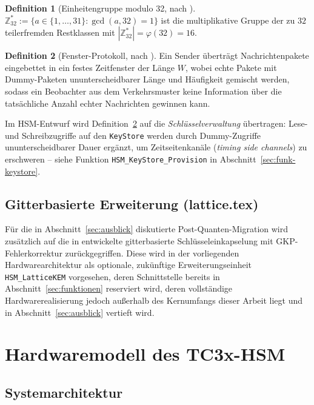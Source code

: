 ﻿\documentclass[a4paper,12pt]{article}
\theoremstyle{definition}
\newtheorem{definition}{Definition}
\begin{document}
\begin{definition}[Einheitengruppe modulo 32, nach \cite{Epp26c}]
	\label{def:z32}
	$\mathbb{Z}_{32}^* := \{a \in \{1,\ldots,31\} : \gcd(a,32) = 1\}$ ist die multiplikative Gruppe der zu $32$ teilerfremden Restklassen mit $|\mathbb{Z}_{32}^*| = \varphi(32) = 16$.
\end{definition}

\begin{definition}[Fenster-Protokoll, nach \cite{Epp26c}]
	\label{def:fenster}
	Ein Sender überträgt Nachrichtenpakete eingebettet in ein festes Zeitfenster der Länge $W$, wobei echte Pakete mit Dummy-Paketen ununterscheidbarer Länge und Häufigkeit gemischt werden, sodass ein Beobachter aus dem Verkehrsmuster keine Information über die tatsächliche Anzahl echter Nachrichten gewinnen kann.
\end{definition}

Im HSM-Entwurf wird Definition~\ref{def:fenster} auf die \emph{Schlüsselverwaltung} übertragen: Lese- und Schreibzugriffe auf den \texttt{KeyStore} werden durch Dummy-Zugriffe ununterscheidbarer Dauer ergänzt, um Zeitseitenkanäle (\emph{timing side channels}) zu erschweren -- siehe Funktion \texttt{HSM\_KeyStore\_Provision} in Abschnitt~\ref{sec:funk-keystore}.

\subsection{Gitterbasierte Erweiterung (lattice.tex)}

Für die in Abschnitt~\ref{sec:ausblick} diskutierte Post-Quanten-Migration wird zusätzlich auf die in \cite{Epp26d} entwickelte gitterbasierte Schlüsseleinkapselung mit GKP-Fehlerkorrektur zurückgegriffen. Diese wird in der vorliegenden Hardwarearchitektur als optionale, zukünftige Erweiterungseinheit \texttt{HSM\_LatticeKEM} vorgesehen, deren Schnittstelle bereits in Abschnitt~\ref{sec:funktionen} reserviert wird, deren vollständige Hardwarerealisierung jedoch außerhalb des Kernumfangs dieser Arbeit liegt und in Abschnitt~\ref{sec:ausblick} vertieft wird.

\section{Hardwaremodell des TC3x-HSM}
\label{sec:hwmodell}

\subsection{Systemarchitektur}
\end{document}
